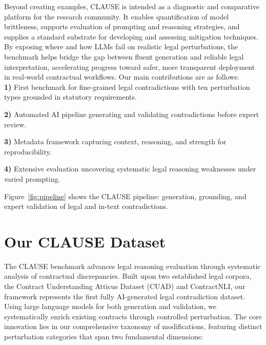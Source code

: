 \documentclass[11pt]{article}
\newcommand{\datasetName}{{\sc CLAUSE}\xspace}
\begin{document}
Beyond creating examples, \datasetName is intended as a diagnostic and comparative platform for the research community. It enables quantification of model brittleness, supports evaluation of prompting and reasoning strategies, and supplies a standard substrate for developing and assessing mitigation techniques. By exposing where and how LLMs fail on realistic legal perturbations, the benchmark helps bridge the gap between fluent generation and reliable legal interpretation, accelerating progress toward safer, more transparent deployment in real-world contractual workflows. Our main contributions are as follows:\\


\vspace{-0.6em}
\noindent\textbf{1)} First benchmark for fine-grained legal contradictions with ten perturbation types grounded in statutory requirements.
    
\noindent\textbf{2)} Automated AI pipeline generating and validating contradictions before expert review.
    
\noindent\textbf{3)} Metadata framework capturing context, reasoning, and strength for reproducibility.
    
\noindent\textbf{4)} Extensive evaluation uncovering systematic legal reasoning weaknesses under varied prompting.

Figure~\ref{fig:pipeline} shows the CLAUSE pipeline: generation, grounding, and expert validation of legal and in-text contradictions.


\section{Our \datasetName Dataset}
The \datasetName benchmark advances legal reasoning evaluation through systematic analysis of contractual discrepancies. Built upon two established legal corpora, the Contract Understanding Atticus Dataset (CUAD) and ContractNLI, our framework represents the first fully AI-generated legal contradiction dataset. Using large language models for both generation and validation, we systematically enrich existing contracts through controlled perturbation. The core innovation lies in our comprehensive taxonomy of modifications, featuring distinct perturbation categories that span two fundamental dimensions:
\end{document}
